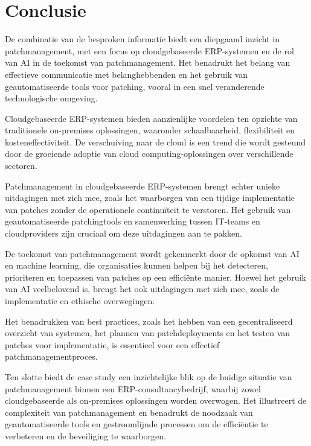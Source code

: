 
\chapter{Conclusie}%
\label{ch:conclusie}


De combinatie van de besproken informatie biedt een diepgaand inzicht in patchmanagement, met een focus op cloudgebaseerde ERP-systemen en de rol van AI in de toekomst van patchmanagement. Het benadrukt het belang van effectieve communicatie met belanghebbenden en het gebruik van geautomatiseerde tools voor patching, vooral in een snel veranderende technologische omgeving.

Cloudgebaseerde ERP-systemen bieden aanzienlijke voordelen ten opzichte van traditionele on-premises oplossingen, waaronder schaalbaarheid, flexibiliteit en kosteneffectiviteit. De verschuiving naar de cloud is een trend die wordt gesteund door de groeiende adoptie van cloud computing-oplossingen over verschillende sectoren.

Patchmanagement in cloudgebaseerde ERP-systemen brengt echter unieke uitdagingen met zich mee, zoals het waarborgen van een tijdige implementatie van patches zonder de operationele continuïteit te verstoren. Het gebruik van geautomatiseerde patchingtools en samenwerking tussen IT-teams en cloudproviders zijn cruciaal om deze uitdagingen aan te pakken.

De toekomst van patchmanagement wordt gekenmerkt door de opkomst van AI en machine learning, die organisaties kunnen helpen bij het detecteren, prioriteren en toepassen van patches op een efficiënte manier. Hoewel het gebruik van AI veelbelovend is, brengt het ook uitdagingen met zich mee, zoals de implementatie en ethische overwegingen.

Het benadrukken van best practices, zoals het hebben van een gecentraliseerd overzicht van systemen, het plannen van patchdeployments en het testen van patches voor implementatie, is essentieel voor een effectief patchmanagementproces.

Ten slotte biedt de case study een inzichtelijke blik op de huidige situatie van patchmanagement binnen een ERP-consultancybedrijf, waarbij zowel cloudgebaseerde als on-premises oplossingen worden overwogen. Het illustreert de complexiteit van patchmanagement en benadrukt de noodzaak van geautomatiseerde tools en gestroomlijnde processen om de efficiëntie te verbeteren en de beveiliging te waarborgen.